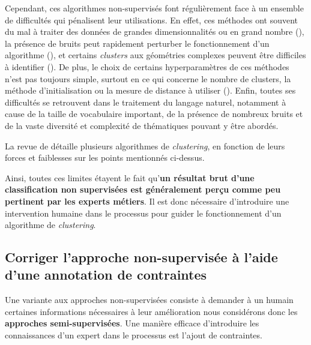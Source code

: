 		Cependant, ces algorithmes non-supervisés font régulièrement face à un ensemble de difficultés qui pénalisent leur utilisations.
		En effet, ces méthodes ont souvent du mal à traiter des données de grandes dimensionnalités ou en grand nombre (\cite{steinbach-etal:2004:challenges-clustering-high}), la présence de bruits peut rapidement perturber le fonctionnement d'un algorithme (\cite{yang-wang:2004:competitive-algorithms-clustering}), et certains \textit{clusters} aux géométries complexes peuvent être difficiles à identifier (\cite{kriegel-etal:2011:density-based-clustering}).
		De plus, le choix de certains hyperparamètres de ces méthodes n'est pas toujours simple, surtout en ce qui concerne le nombre de clusters, la méthode d'initialisation ou la mesure de distance à utiliser (\cite{agarwal-etal:2011:issues-challenges-tools}).
		Enfin, toutes ses difficultés se retrouvent dans le traitement du langage naturel, notamment à cause de la taille de vocabulaire important, de la présence de nombreux bruits et de la vaste diversité et complexité de thématiques pouvant y être abordés.
		\begin{leftBarInformation}
			La revue de \cite{xu-tian:2015:comprehensive-survey-clustering} détaille plusieurs algorithmes de \textit{clustering}, en fonction de leurs forces et faiblesses sur les points mentionnés ci-dessus.
		\end{leftBarInformation}
		
		Ainsi, toutes ces limites étayent le fait qu'\textbf{un résultat brut d'une classification non supervisées est généralement perçu comme peu pertinent par les experts métiers}.
		Il est donc nécessaire d'introduire une intervention humaine dans le processus pour guider le fonctionnement d'un algorithme de \textit{clustering}.
		
	
	\subsection{Corriger l'approche non-supervisée à l'aide d'une annotation de contraintes}
	\label{section:3.1.2-INTUITIONS-ORIGINES-SEMI-SUPERVISEES}
	
		Une variante aux approches non-supervisées consiste à demander à un humain certaines informations nécessaires à leur amélioration nous considérons donc les \textbf{approches semi-supervisées}.
		Une manière efficace d'introduire les connaissances d'un expert dans le processus est l'ajout de contraintes.
		
